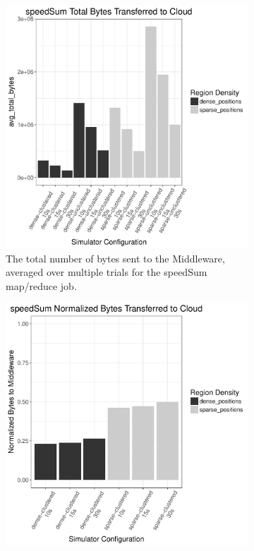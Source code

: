 \documentclass{thesis}
\begin{document}
    \begin{figure}
        \centering
        \begin{subfigure}[h]{0.45\textwidth}
            \centering
            \includegraphics[width=\textwidth]{binImages/speedSum-runplot.pdf}
            \caption{The total number of bytes sent to the Middleware,
            averaged over multiple trials for the speedSum map/reduce job.} 
        \end{subfigure}
        \begin{subfigure}[h]{0.45\textwidth}
            \centering
            \includegraphics[width=\textwidth]{binImages/speedSum-runplot-normalized.pdf}

\end{subfigure}
\end{figure}
\end{document}
